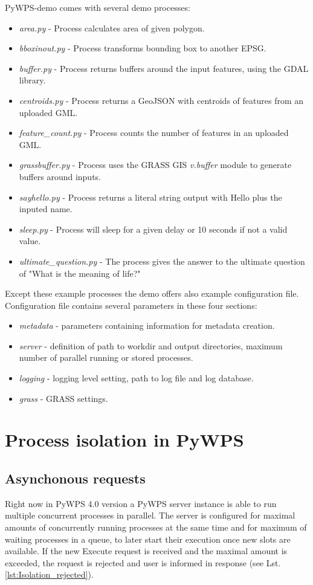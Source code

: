 PyWPS-demo comes with several demo processes:
\begin{itemize}
\item \textit{area.py} - Process calculates area of given polygon.
\item \textit{bboxinout.py} - Process transforms bounding box to another EPSG.
\item \textit{buffer.py} - Process returns buffers around the input features, using the GDAL library.
\item \textit{centroids.py} - Process returns a GeoJSON with centroids of features from an uploaded GML.
\item \textit{feature\_count.py} - Process counts the number of features in an uploaded GML.
\item \textit{grassbuffer.py} - Process uses the  GRASS GIS \textit{v.buffer} module to generate buffers around inputs.
\item \textit{sayhello.py} - Process returns a literal string output with Hello plus the inputed name.
\item \textit{sleep.py} - Process will sleep for a given delay or 10 seconds if not a valid value.
\item \textit{ultimate\_question.py} - The process gives the answer to the ultimate question of "What is the meaning of life?"
\end{itemize}

Except these example processes the demo offers also example configuration file. Configuration file contains several parameters in
these four sections:
\begin{itemize}
\item \textit{metadata} - parameters containing information for metadata creation.
\item \textit{server} - definition of path to workdir and output directories, maximum number of parallel running or stored processes. 
\item \textit{logging} - logging level setting, path to log file and log database.
\item \textit{grass} - GRASS settings.
\end{itemize}



\newpage
\section{Process isolation in PyWPS}
\subsection{Asynchonous requests}
Right now in PyWPS 4.0 version a PyWPS server instance is able to run
multiple concurrent processes in parallel. The server is configured
for maximal amounts of concurrently running processes at the same time
and for maximum of waiting processes in a queue, to later
start their execution once new slots are available. If the new Execute
request is received and the maximal amount is exceeded, the request is
rejected and user is informed in response (see
Lst. \ref{lst:Isolation_rejected}).

